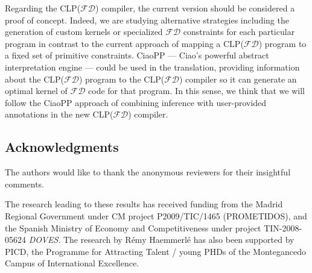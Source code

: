 \documentclass{llncs}
\newcommand{\clpfd}{CLP($\mathcal{FD}$)\xspace}
\newcommand{\fd}{$\mathcal{FD}$\xspace}
\begin{document}
Regarding the \clpfd compiler, the current version should be
considered a proof of concept. Indeed, we are studying alternative
strategies including the generation of custom kernels or specialized
\fd constraints for each particular program in contrast to the current
approach of mapping a \clpfd program to a fixed set of primitive
constraints. CiaoPP --- Ciao's powerful abstract interpretation engine
--- could be used in the translation, providing information about the
\clpfd program to the \clpfd compiler so it can generate an optimal
kernel of \fd code for that program.  In this sense, we think that we
will follow the CiaoPP approach of combining inference with
user-provided annotations in the new \clpfd compiler.

\subsection*{Acknowledgments}

The authors would like to thank the anonymous reviewers for their
insightful comments.

The research leading to these results has received funding from the
Madrid Regional Government under CM project P2009/TIC/1465
(PROMETIDOS), and the Spanish Ministry of Economy and Competitiveness
under project TIN-2008-05624 {\em DOVES}.  The research by R\'emy
Haemmerl\'e has also been supported by PICD, the Programme for
Attracting Talent / young PHDs of the Montegancedo Campus of
International Excellence.
\end{document}
